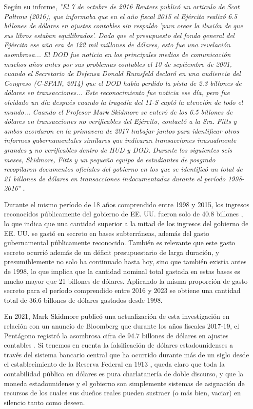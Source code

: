 \documentclass[10pt,twocolumn,letterpaper]{article}
\begin{document}
Según su informe, \textit{"El 7 de octubre de 2016 Reuters publicó un artículo de Scot Paltrow (2016), que informaba que en el año fiscal 2015 el Ejército realizó 6.5 billones de dólares en ajustes contables sin respaldo 'para crear la ilusión de que sus libros estaban equilibrados'. Dado que el presupuesto del fondo general del Ejército ese año era de 122 mil millones de dólares, esto fue una revelación asombrosa... El DOD fue noticia en los principales medios de comunicación muchos años antes por sus problemas contables el 10 de septiembre de 2001, cuando el Secretario de Defensa Donald Rumsfeld declaró en una audiencia del Congreso (C-SPAN, 2014) que el DOD había perdido la pista de 2.3 billones de dólares en transacciones... Este reconocimiento fue noticia ese día, pero fue olvidado un día después cuando la tragedia del 11-S captó la atención de todo el mundo... Cuando el Profesor Mark Skidmore se enteró de los 6.5 billones de dólares en transacciones no verificables del Ejército, contactó a la Sra. Fitts y ambos acordaron en la primavera de 2017 trabajar juntos para identificar otros informes gubernamentales similares que indicaran transacciones inusualmente grandes y no verificables dentro de HUD y DOD. Durante los siguientes seis meses, Skidmore, Fitts y un pequeño equipo de estudiantes de posgrado recopilaron documentos oficiales del gobierno en los que se identificó un total de 21 billones de dólares en transacciones indocumentadas durante el período 1998-2016"} \cite{12}.

Durante el mismo período de 18 años comprendido entre 1998 y 2015, los ingresos reconocidos públicamente del gobierno de EE. UU. fueron solo de 40.8 billones \cite{15}, lo que indica que una cantidad superior a la mitad de los ingresos del gobierno de EE. UU. se gastó en secreto en bases subterráneas, además del gasto gubernamental públicamente reconocido. También es relevante que este gasto secreto ocurrió además de un déficit presupuestario de larga duración, y presumiblemente no solo ha continuado hasta hoy, sino que también existía antes de 1998, lo que implica que la cantidad nominal total gastada en estas bases es mucho mayor que 21 billones de dólares. Aplicando la misma proporción de gasto secreto para el período comprendido entre 2016 y 2023 se obtiene una cantidad total de 36.6 billones de dólares gastados desde 1998.

En 2021, Mark Skidmore publicó una actualización de esta investigación en relación con un anuncio de Bloomberg que durante los años fiscales 2017-19, el Pentágono registró la asombrosa cifra de 94.7 billones de dólares en ajustes contables \cite{17,18}. Si tenemos en cuenta la falsificación de dólares estadounidenses a través del sistema bancario central que ha ocurrido durante más de un siglo desde el establecimiento de la Reserva Federal en 1913 \cite{37}, queda claro que toda la contabilidad pública en dólares es pura charlatanería de doble discurso, y que la moneda estadounidense y el gobierno son simplemente sistemas de asignación de recursos de los cuales sus dueños reales pueden sustraer (o más bien, vaciar) en silencio tanto como deseen.
\end{document}
